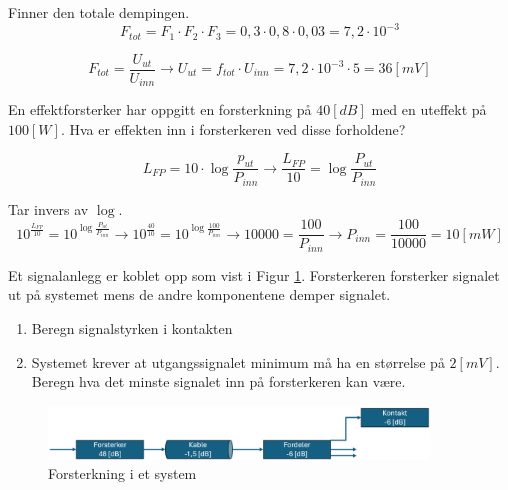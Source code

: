 \vspace{0.5cm} %

\begin{solution}[name=Løsningsforslag oppgave]
Finner den totale dempingen.
\[F_{tot}= F_1 \cdot F_2 \cdot F_3 = 0,3 \cdot 0,8 \cdot 0,03 = 7,2 \cdot 10^{-3}\]

\[F_{tot}=\frac{U_{ut}}{U_{inn}} \rightarrow U_{ut}=f_{tot} \cdot U_{inn}=7,2 \cdot 10^{-3} \cdot 5 = 36[mV]\]
	
\end{solution}


\vspace{0.5cm} %


\begin{question}[name=Oppgave, topic=forsterkning]
En effektforsterker har oppgitt en forsterkning på $40 [dB]$ med en uteffekt på $100[W]$. Hva er effekten inn i forsterkeren ved disse forholdene?
\end{question}

\vspace{0.5cm} %

\begin{solution}[name=Løsningsforslag oppgave]
\[L_{FP}=10 \cdot \log \frac{p_{ut}}{P_{inn}} \rightarrow \frac{L_{FP}}{10}=\log \frac{P_{ut}}{P_{inn}}\]

Tar invers av $\log$.
\[10^{\frac{L_{FP}}{ 10}}= 10^{\log \frac{P_{ut}}{P_{inn}}} \rightarrow 10^{\frac{40}{10}}=10^{\log \frac{100}{P_{inn}}} \rightarrow 10000= \frac{100}{P_{inn}} \rightarrow P_{inn}=\frac{100}{10000}=10[mW]\]
	
\end{solution}


\vspace{0.5cm} %




\begin{question}[name=Oppgave, topic=forsterkning]
Et signalanlegg er koblet opp som vist i Figur \ref{fig:forsterk5}. Forsterkeren forsterker signalet ut på systemet mens de andre komponentene demper signalet.
	\begin{enumerate}[label=\roman*)]
	\item Beregn signalstyrken i kontakten
	\item Systemet krever at utgangssignalet minimum må ha en størrelse på $2[mV]$. Beregn hva det minste signalet inn på forsterkeren kan være.
	\end{enumerate}

	\begin{figure}[H]
	\centering
	\includegraphics[width=0.9\textwidth]{forsterkning/figurer/forsterkning4.png}
	\caption{Forsterkning i et system}
	\label{fig:forsterk5}
\end{figure}

\end{question}

